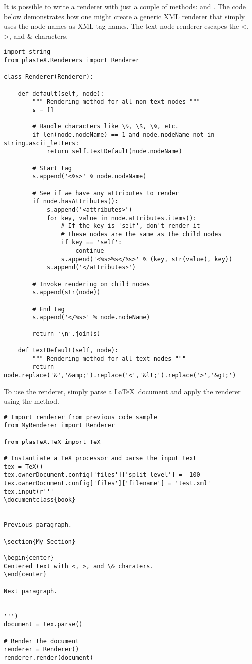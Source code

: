 It is possible to write a renderer with just a couple of methods:
 and .
The code below demonstrates how one might create a generic XML
renderer that simply uses the node names as XML tag names.
The text node renderer escapes the <, >, and \& characters.
\begin{verbatim}
import string
from plasTeX.Renderers import Renderer

class Renderer(Renderer):

    def default(self, node):
        """ Rendering method for all non-text nodes """
        s = []

        # Handle characters like \&, \$, \%, etc.
        if len(node.nodeName) == 1 and node.nodeName not in string.ascii_letters:
            return self.textDefault(node.nodeName)

        # Start tag
        s.append('<%s>' % node.nodeName)

        # See if we have any attributes to render
        if node.hasAttributes():
            s.append('<attributes>')
            for key, value in node.attributes.items():
                # If the key is 'self', don't render it
                # these nodes are the same as the child nodes
                if key == 'self':
                    continue
                s.append('<%s>%s</%s>' % (key, str(value), key))
            s.append('</attributes>')

        # Invoke rendering on child nodes
        s.append(str(node))

        # End tag
        s.append('</%s>' % node.nodeName)

        return '\n'.join(s)

    def textDefault(self, node):
        """ Rendering method for all text nodes """
        return node.replace('&','&amp;').replace('<','&lt;').replace('>','&gt;')
\end{verbatim}

To use the renderer, simply parse a \LaTeX\ document and apply the renderer
using the  method.
\begin{verbatim}
# Import renderer from previous code sample
from MyRenderer import Renderer

from plasTeX.TeX import TeX

# Instantiate a TeX processor and parse the input text
tex = TeX()
tex.ownerDocument.config['files']['split-level'] = -100
tex.ownerDocument.config['files']['filename'] = 'test.xml'
tex.input(r'''
\documentclass{book}


Previous paragraph.

\section{My Section}

\begin{center}
Centered text with <, >, and \& charaters.
\end{center}

Next paragraph.


''')
document = tex.parse()

# Render the document
renderer = Renderer()
renderer.render(document)
\end{verbatim}

